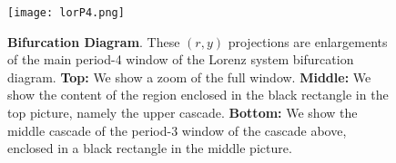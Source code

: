\begin{figure}
 \centering
 \texttt{[image: lorP4.png]}
 \caption{{\bf Bifurcation Diagram}. These $(r,y)$ projections are enlargements of the main period-4 window of the Lorenz system bifurcation diagram. {\bf Top:} We show a zoom of the full window. {\bf Middle:} We show the content of the region enclosed in the black rectangle in the top picture, namely the upper cascade. {\bf Bottom:} We show the middle cascade of the period-3 window of the cascade above, enclosed in a black rectangle in the middle picture.}
 \label{fig:p4}
\end{figure} 
